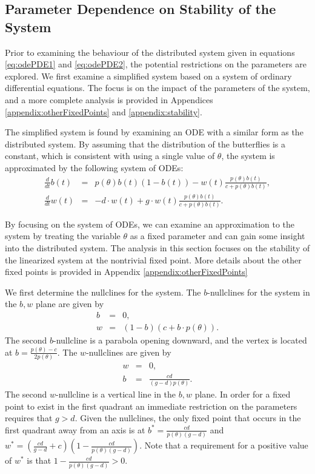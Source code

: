 \documentclass[12pt]{article}
\begin{document}
\subsection{Parameter Dependence on Stability of the System}
\label{subsection:parameters}

Prior to examining the behaviour of the distributed system given in
equations \ref{eq:odePDE1} and \ref{eq:odePDE2}, the potential
restrictions on the parameters are explored. We first examine a
simplified system based on a system of ordinary differential
equations.  The focus is on the impact of the parameters of the
system, and a more complete analysis is provided in Appendices
\ref{appendix:otherFixedPoints} and \ref{appendix:stability}.

The simplified system is found by examining an ODE with a similar form
as the distributed system. By assuming that the distribution of the
butterflies is a constant, which is consistent with using a single
value of $\theta$, the system is approximated by the following system
of ODEs:
\begin{eqnarray}
  \label{eq:scaledODE1}
  \frac{d}{dt} b(t) & = &
      p(\theta) b(t) (1 - b(t))
      -  w(t) \frac{p(\theta) b(t)}{c+p(\theta)b(t)}, \\
  \label{eq:scaledODE2}
  \frac{d}{dt} w(t) & = & -d \cdot w(t) +
       g \cdot w(t) \frac{p(\theta) b(t) }{c + p(\theta) b(t)}.
\end{eqnarray}

By focusing on the system of ODEs, we can examine an approximation to
the system by treating the variable $\theta$ as a fixed parameter and
can gain some insight into the distributed system. The analysis in
this section focuses on the stability of the linearized system at the
nontrivial fixed point. More details about the other fixed points is
provided in Appendix \ref{appendix:otherFixedPoints}

We first determine the nullclines for the system.
The $b$-nullclines for the system in the $b,w$ plane are given by
\begin{eqnarray}
  \label{eq:bnullclines}
  b & = & 0, \\
  w & = & (1-b)(c+b\cdot p(\theta)).
\end{eqnarray}
The second $b$-nullcline is a parabola opening downward, and the vertex is located at
$b=\frac{p(\theta)-c}{2p(\theta)}$. The $w$-nullclines are given by
\begin{eqnarray}
  \label{eq:wnullclines}
  w & = & 0, \\
  b & = & \frac{cd}{(g-d)p(\theta)}.
\end{eqnarray}
The second $w$-nullcline is a vertical line in the $b,w$ plane. In
order for a fixed point to exist in the first quadrant an immediate
restriction on the parameters requires that $g>d$.  Given the
nullclines, the only fixed point that occurs in the first quadrant
away from an axis is at $b^*=\frac{cd}{p(\theta)(g-d)}$ and
$w^*=\left(\frac{cd}{g-d}+c\right)\left(1-\frac{cd}{p(\theta)(g-d)}\right)$.
Note that a requirement for a positive value of $w^*$ is that
$1-\frac{cd}{p(\theta)(g-d)}>0$.
\end{document}
